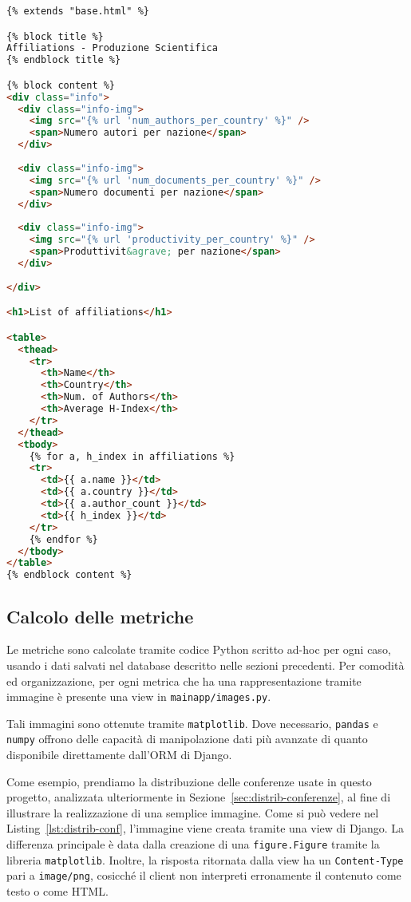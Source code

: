 \begin{lstlisting}[language=html, caption=Estratto di \texttt{template/affiliation.html}, label=lst:affiliation_html]
{% extends "base.html" %}

{% block title %}
Affiliations - Produzione Scientifica
{% endblock title %}

{% block content %}
<div class="info">
  <div class="info-img">
    <img src="{% url 'num_authors_per_country' %}" />
    <span>Numero autori per nazione</span>
  </div>
  
  <div class="info-img">
    <img src="{% url 'num_documents_per_country' %}" />
    <span>Numero documenti per nazione</span>
  </div>
  
  <div class="info-img">
    <img src="{% url 'productivity_per_country' %}" />
    <span>Produttivit&agrave; per nazione</span>
  </div>
  
</div>

<h1>List of affiliations</h1>

<table>
  <thead>
    <tr>
      <th>Name</th>
      <th>Country</th>
      <th>Num. of Authors</th>
      <th>Average H-Index</th>
    </tr>
  </thead>
  <tbody>
    {% for a, h_index in affiliations %}
    <tr>
      <td>{{ a.name }}</td>
      <td>{{ a.country }}</td>
      <td>{{ a.author_count }}</td>
      <td>{{ h_index }}</td>
    </tr>
    {% endfor %}
  </tbody>
</table>
{% endblock content %}

\end{lstlisting}

\subsection{Calcolo delle metriche}

Le metriche sono calcolate tramite codice Python scritto ad-hoc per ogni
caso, usando i dati salvati nel database descritto nelle sezioni precedenti.
Per comodità ed organizzazione, per ogni metrica che ha una rappresentazione
tramite immagine è presente una view in \texttt{mainapp/images.py}.

Tali immagini sono ottenute tramite \texttt{matplotlib}. Dove necessario,
\texttt{pandas} e \texttt{numpy} offrono delle capacità di manipolazione dati
più avanzate di quanto disponibile direttamente dall'ORM di Django.

Come esempio, prendiamo la distribuzione delle conferenze usate in questo
progetto, analizzata ulteriormente in Sezione~\ref{sec:distrib-conferenze},
al fine di illustrare la realizzazione di una semplice immagine.
Come si può vedere nel Listing~\ref{lst:distrib-conf}, l'immagine viene creata
tramite una view di Django. La differenza principale è data dalla creazione
di una \texttt{figure.Figure} tramite la libreria \texttt{matplotlib}.
Inoltre, la risposta ritornata dalla view ha un \texttt{Content-Type} pari a
\texttt{image/png}, cosicché il client non interpreti erronamente il contenuto
come testo o come HTML.

